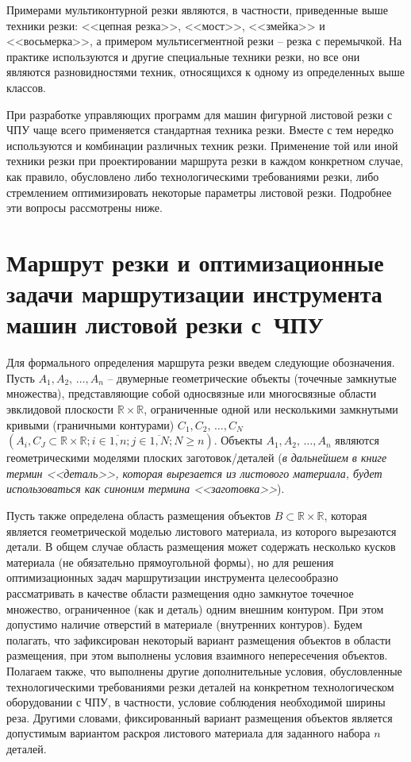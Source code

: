 \documentclass[11pt,twoside,openany]{report}
\begin{document}
Примерами мультиконтурной резки являются,
в частности, приведенные выше техники резки:
<<цепная резка>>, <<мост>>, <<змейка>> и <<восьмерка>>,
а примером мультисегментной резки --
резка с перемычкой.
На практике используются и другие специальные техники резки,
но все они являются разновидностями техник,
относящихся к одному из определенных выше классов.

При разработке управляющих программ для
машин фигурной листовой резки с ЧПУ чаще всего
применяется стандартная техника резки.
Вместе с тем нередко используются и
комбинации различных техник резки.
Применение той или иной техники резки
при проектировании маршрута резки в
каждом конкретном случае, как правило,
обусловлено либо технологическими требованиями резки,
либо стремлением оптимизировать некоторые
параметры листовой резки.
Подробнее эти вопросы рассмотрены ниже.

\section{
  Маршрут резки и оптимизационные задачи
  маршрутизации инструмента машин листовой
  резки с~ЧПУ
}
\label{sect:1.2}

Для формального определения маршрута резки
введем следующие обозначения.
Пусть
$A_1, A_2, \,\dots, A_n$
– двумерные геометрические объекты (точечные замкнутые множества),
представляющие собой односвязные или
многосвязные области эвклидовой плоскости
$\mathbb R \times \mathbb R$,
ограниченные одной или несколькими замкнутыми кривыми
(граничными контурами)
$C_1, C_2, \,\dots, C_N$
$(A_i, C_J \subset \mathbb R \times \mathbb R;
i \in \overline{1,n};
j \in \overline{1, N};
N \geqslant n)$.
Объекты
$A_1, A_2, \,\dots, A_n$
являются геометрическими моделями плоских заготовок/деталей
({\it в дальнейшем в книге термин <<деталь>>,
которая вырезается из листового материала,
будет использоваться как синоним термина <<заготовка>>}).

Пусть также определена область размещения объектов
$B \subset \mathbb R \times \mathbb R$,
которая является геометрической моделью листового материала,
из которого вырезаются детали.
В общем случае область размещения
может содержать несколько кусков материала
(не обязательно прямоугольной формы),
но для решения оптимизационных задач
маршрутизации инструмента целесообразно рассматривать
в качестве области размещения одно замкнутое точечное множество,
ограниченное (как и деталь)
одним внешним контуром.
При этом допустимо наличие отверстий в материале
(внутренних контуров).
Будем полагать, что зафиксирован некоторый вариант размещения
объектов в области размещения,
при этом выполнены условия взаимного непересечения объектов.
Полагаем также, что выполнены другие дополнительные условия,
обусловленные технологическими требованиями резки деталей
на конкретном технологическом оборудовании с ЧПУ,
в частности, условие соблюдения необходимой ширины реза.
Другими словами, фиксированный вариант размещения объектов
является допустимым вариантом раскроя листового материала
для заданного набора $n$ деталей.
\end{document}
